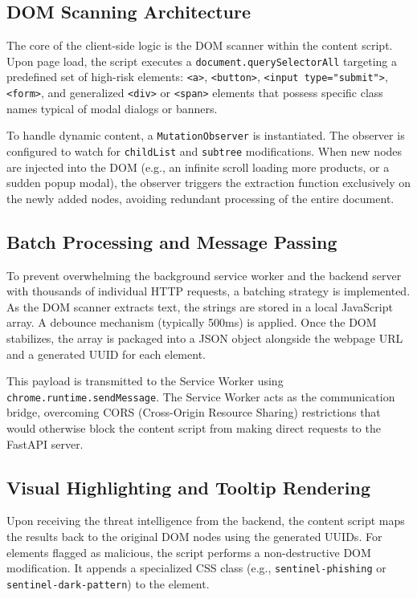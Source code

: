 \subsection{DOM Scanning Architecture}
The core of the client-side logic is the DOM scanner within the content script. Upon page load, the script executes a \texttt{document.querySelectorAll} targeting a predefined set of high-risk elements: \texttt{<a>}, \texttt{<button>}, \texttt{<input type="submit">}, \texttt{<form>}, and generalized \texttt{<div>} or \texttt{<span>} elements that possess specific class names typical of modal dialogs or banners.

To handle dynamic content, a \texttt{MutationObserver} is instantiated. The observer is configured to watch for \texttt{childList} and \texttt{subtree} modifications. When new nodes are injected into the DOM (e.g., an infinite scroll loading more products, or a sudden popup modal), the observer triggers the extraction function exclusively on the newly added nodes, avoiding redundant processing of the entire document.

\subsection{Batch Processing and Message Passing}
To prevent overwhelming the background service worker and the backend server with thousands of individual HTTP requests, a batching strategy is implemented. As the DOM scanner extracts text, the strings are stored in a local JavaScript array. A debounce mechanism (typically 500ms) is applied. Once the DOM stabilizes, the array is packaged into a JSON object alongside the webpage URL and a generated UUID for each element.

This payload is transmitted to the Service Worker using \texttt{chrome.runtime.sendMessage}. The Service Worker acts as the communication bridge, overcoming CORS (Cross-Origin Resource Sharing) restrictions that would otherwise block the content script from making direct requests to the FastAPI server.

\subsection{Visual Highlighting and Tooltip Rendering}
Upon receiving the threat intelligence from the backend, the content script maps the results back to the original DOM nodes using the generated UUIDs. For elements flagged as malicious, the script performs a non-destructive DOM modification. It appends a specialized CSS class (e.g., \texttt{sentinel-phishing} or \texttt{sentinel-dark-pattern}) to the element.

